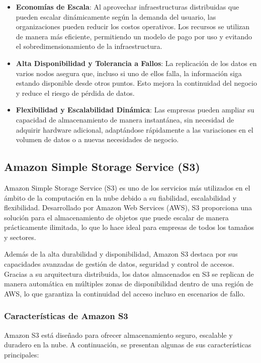 {\begin{itemize}
                \item \textbf{Economías de Escala}: Al aprovechar infraestructuras distribuidas que pueden escalar dinámicamente según la demanda del usuario, las organizaciones pueden reducir los costos operativos. Los recursos se utilizan de manera más eficiente, permitiendo un modelo de pago por uso y evitando el sobredimensionamiento de la infraestructura.
            
                \item \textbf{Alta Disponibilidad y Tolerancia a Fallos}: La replicación de los datos en varios nodos asegura que, incluso si uno de ellos falla, la información siga estando disponible desde otros puntos. Esto mejora la continuidad del negocio y reduce el riesgo de pérdida de datos.
            
                \item \textbf{Flexibilidad y Escalabilidad Dinámica}: Las empresas pueden ampliar su capacidad de almacenamiento de manera instantánea, sin necesidad de adquirir hardware adicional, adaptándose rápidamente a las variaciones en el volumen de datos o a nuevas necesidades de negocio.
            \end{itemize}
            
        \subsection{Amazon Simple Storage Service (S3)}
            Amazon Simple Storage Service (S3) es uno de los servicios más utilizados en el ámbito de la computación en la nube debido a su fiabilidad, escalabilidad y flexibilidad. Desarrollado por Amazon Web Services (AWS), S3 proporciona una solución para el almacenamiento de objetos que puede escalar de manera prácticamente ilimitada, lo que lo hace ideal para empresas de todos los tamaños y sectores.
            
            Además de la alta durabilidad y disponibilidad, Amazon S3 destaca por sus capacidades avanzadas de gestión de datos, seguridad y control de accesos. Gracias a su arquitectura distribuida, los datos almacenados en S3 se replican de manera automática en múltiples zonas de disponibilidad dentro de una región de AWS, lo que garantiza la continuidad del acceso incluso en escenarios de fallo.
            
            \subsubsection{Características de Amazon S3}
                Amazon S3 está diseñado para ofrecer almacenamiento seguro, escalable y duradero en la nube. A continuación, se presentan algunas de sus características principales:
            
}
